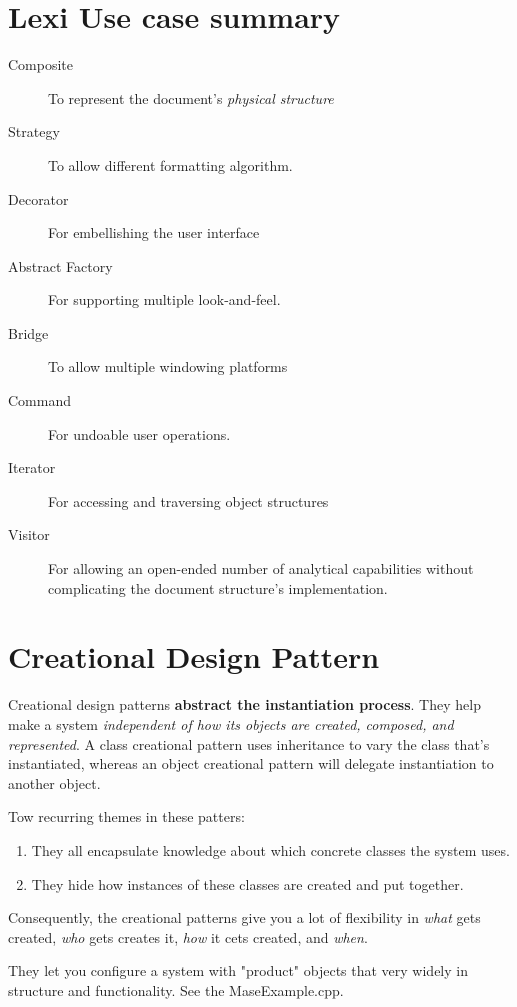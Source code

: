 \documentclass[11pt, a4paper]{book}
\begin{document}
\chapter{Lexi Use case summary}
\begin{description}
\item [Composite] To represent the document's \emph{physical structure}
\item [Strategy] To allow different formatting algorithm.
\item [Decorator] For embellishing the user interface
\item [Abstract Factory] For supporting multiple look-and-feel.  \item [Bridge] To allow multiple windowing platforms
\item [Command] For undoable user operations.
\item [Iterator] For accessing and traversing object structures
\item [Visitor] For allowing an open-ended number of analytical capabilities
without complicating the document structure's implementation.
\end{description}

\chapter{Creational Design Pattern}
Creational design patterns \textbf{abstract the instantiation process}. They
help make a system \emph{independent of how its objects are created, composed,
and represented}. A class creational pattern uses inheritance to vary the class
that's instantiated, whereas an object creational pattern will delegate
instantiation to another object.

Tow recurring themes in these patters:
\begin{enumerate}
    \item They all encapsulate knowledge about which concrete classes the system
    uses.
    \item They hide how instances of these classes are created and put together.
\end{enumerate}
Consequently, the creational patterns give you a lot of flexibility in
\emph{what} gets created, \emph{who} gets creates it, \emph{how} it cets
created, and \emph{when}.

They let you configure a system with "product" objects that very widely in
structure and functionality. See the MaseExample.cpp.
\end{document}
